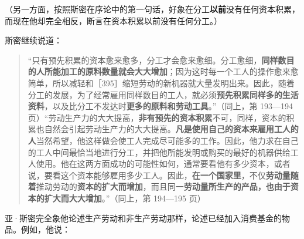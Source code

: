 （另一方面，按照斯密在序论中的第一句话，好象在分工\textbf{以前}没有任何资本积累，而现在他却完全相反，断言在资本积累以前没有任何分工。）

斯密继续说道：

\begin{quote}“只有预先积累的资本愈来愈多，分工才会愈来愈细。分工愈细，\textbf{同样数目的人所能加工的原料数量就会大大增加}；因为这时每一个工人的操作愈来愈简单，所以减轻和［395］缩短劳动的新机器就大量发明出来。因此，随着分工的发展，为了经常雇用同样数目的工人，就必须\textbf{预先积累同样多的生活资料}，以及比分工不发达时\textbf{更多的原料和劳动工具}。”（同上，第 193—194 页）“劳动生产力的大大提高，\textbf{非有预先的资本积累}不可，同样，资本的积累也自然会引起劳动生产力的大大提高。\textbf{凡是使用自己的资本来雇用工人的人}当然希望，他这样做会使工人完成尽可能多的工作。因此，他力求在自己的工人中间最恰当地进行分工，并把他所能发明或购买的最好的机器供给工人使用。他在这两方面成功的可能性如何，通常要看他有多少资本，或者说，要看这个资本能够雇用多少工人。因此，\textbf{在一个国家里}，不仅\textbf{劳动量随着}推动劳动的\textbf{资本的扩大而增加}，而且同一\textbf{劳动量所生产的产品，也由于资本的扩大而大大增加}。”（同上，第 194—195 页）\end{quote}

亚·斯密完全象他论述生产劳动和非生产劳动那样，论述已经加入消费基金的物品。例如，他说：

